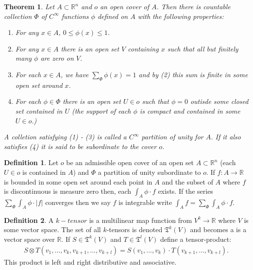 \documentclass[20pt]{article}
\theoremstyle{plain}
\newtheorem{theorem}{Theorem}
\theoremstyle{definition}
\newtheorem{definition}{Definition}
\newcommand{\reals}{\mathbb{R}}
\begin{document}
\begin{theorem}
  Let $A \subset \reals^n$ and $o$ an open cover of $A$.
  Then there is countable collection $\Phi$ of $C^\infty$ 
  functions $\phi$ defined on $A$ with the following properties:
  \begin{enumerate}
    \item For any $x \in A$, $0 \leq \phi(x) \leq 1$.
    \item For any $x \in A$ there is an open set $V$ containing $x$ 
    such that all but finitely many $\phi$ are zero on $V$.
    \item For each $x \in A$, we have $\sum_\Phi \phi(x) = 1$ and 
    by (2) this sum is finite in some open set around $x$.
    \item For each $\phi \in \Phi$ there is an open set $U \in o$
    such that $\phi = 0$ outisde some closed set contained in $U$ 
    (the support of each $\phi$ is compact and contained in some 
    $U \in o$.)
  \end{enumerate}

  A colletion satisfying (1) - (3) is called a $C^\infty$ partition of unity for $A$.
  If it also satisfies (4) it is said to be subordinate to the cover $o$.
\end{theorem}

\vspace{2em}


\begin{definition}
  Let $o$ be an admissible open cover of an open set $A \subset \mathbb{R}^n$
  (each $U \in o$ is contained in $A$) and $\Phi$ a partition of unity 
  subordinate to $o$.  If $f: A \to \reals$ is bounded in some 
  open set around each point in $A$ and the subset of $A$ where $f$
  is discontinuous is measure zero then, each 
  $\int_A \phi \cdot f$ exists.
  If the series $\sum_\Phi \int_A \phi \cdot |f|$ converges 
  then we say $f$ is integrable write 
  $\int_A f = \sum_\Phi \int_A \phi \cdot f$.
\end{definition}

\vspace{3em}
\begin{definition}
  A $k-tensor$ is a multilinear map function from 
  $V^k \to \reals$ where $V$ is some vector space.
  The set of all $k$-tensors is denoted $\mathfrak{T}^k(V)$
  and becomes a is a vector space over $\mathbb{R}$.
  If $S \in \mathfrak{T}^k(V)$ and $T \in \mathfrak{T}^l(V)$
  define a tensor-product:
  \begin{align}
    S \otimes T (v_1, ..., v_k, v_{k+1}, ..., v_{k+l}) = 
    S(v_1, ..., v_k)\cdot T(v_{k+1}, ..., v_{k+l}).
  \end{align}
  This product is left and right distributive and associative.
\end{definition}
\end{document}
